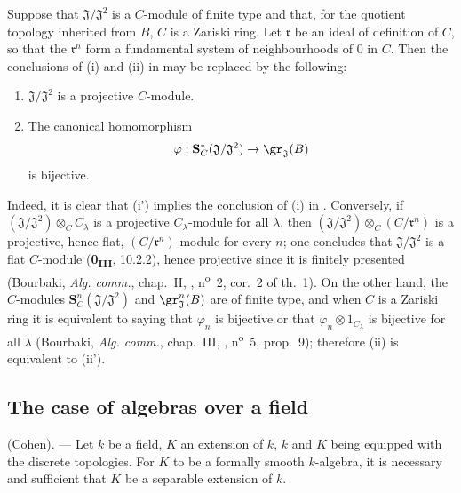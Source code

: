 \begin{remark}[19.5.8]
\label{0.19.5.8}
Suppose that $\mathfrak{J}/\mathfrak{J}^2$ is a $C$-module of finite type and that, for the quotient topology inherited from $B$, $C$ is a Zariski ring.
Let $\mathfrak{r}$ be an ideal of definition of $C$, so that the $\mathfrak{r}^n$ form a fundamental system of neighbourhoods of $0$ in $C$.
Then the conclusions of {\rm(i)} and {\rm(ii)} in  may be replaced by the following:
\begin{enumerate}
  \item[\rm(i')] $\mathfrak{J}/\mathfrak{J}^2$ is a projective $C$-module.
  \item[\rm(ii')] The canonical homomorphism
  \[
    \varphi:\mathbf{S}_C^*(\mathfrak{J}/\mathfrak{J}^2)\to\gr_\mathfrak{J}(B)
  \]
  is bijective.
\end{enumerate}
Indeed, it is clear that {\rm(i')} implies the conclusion of {\rm(i)} in .
Conversely, if $(\mathfrak{J}/\mathfrak{J}^2)\otimes_C C_\lambda$ is a projective $C_\lambda$-module for all $\lambda$, then $(\mathfrak{J}/\mathfrak{J}^2)\otimes_C(C/\mathfrak{r}^n)$ is a projective, hence flat, $(C/\mathfrak{r}^n)$-module for every $n$;
one concludes that $\mathfrak{J}/\mathfrak{J}^2$ is a flat $C$-module (\textbf{0\textsubscript{III}}, 10.2.2), hence projective since it is finitely presented (Bourbaki, \emph{Alg. comm.}, chap.~II, , n\textsuperscript{o}~2, cor.~2 of th.~1).
On the other hand, the $C$-modules $\mathbf{S}_C^n(\mathfrak{J}/\mathfrak{J}^2)$ and $\gr_\mathfrak{J}^n(B)$ are of finite type, and when $C$ is a Zariski ring it is equivalent to saying that $\varphi_n$ is bijective or that $\varphi_n\otimes 1_{C_\lambda}$ is bijective for all $\lambda$ (Bourbaki, \emph{Alg. comm.}, chap.~III, , n\textsuperscript{o}~5, prop.~9);
therefore {\rm(ii)} is equivalent to {\rm(ii')}.
\end{remark}

\subsection{The case of algebras over a field}
\label{subsection:0.19.6}

\begin{theorem}[19.6.1]
\label{0.19.6.1}
{\rm(Cohen).} ---
Let $k$ be a field, $K$ an extension of $k$, $k$ and $K$ being equipped with the discrete topologies.
For $K$ to be a formally smooth $k$-algebra, it is necessary and sufficient that $K$ be a separable extension of $k$.
\end{theorem}

